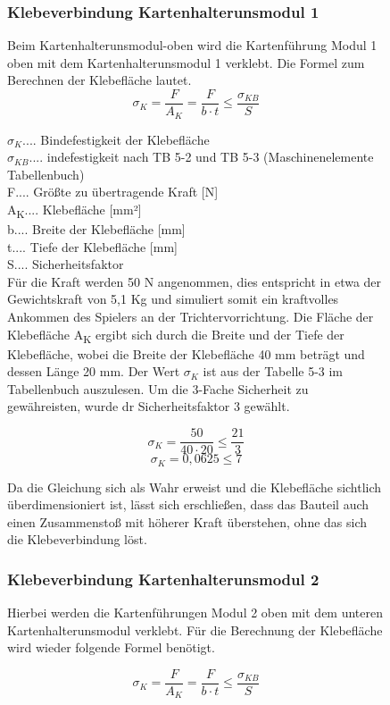 \begin{figure}
\subsubsection{Klebeverbindung Kartenhalterunsmodul 1}
Beim Kartenhalterunsmodul-oben wird die Kartenführung Modul 1 oben mit dem Kartenhalterunsmodul 1 verklebt.
Die Formel zum Berechnen der Klebefläche lautet.
\[\sigma _{K} = \frac{F}{A_{K}} = \frac{F}{b\cdot t}\leq \frac{\sigma _{KB}}{S}\]

$\sigma_{K}$.... Bindefestigkeit der Klebefläche \\
$\sigma_{KB}$.... indefestigkeit nach TB 5-2 und TB 5-3 (Maschinenelemente Tabellenbuch)\\
F.... Größte zu übertragende Kraft [N]\\
A\textsubscript{K}.... Klebefläche [mm²]\\
b.... Breite der Klebefläche [mm]\\
t.... Tiefe der Klebefläche [mm]\\
S.... Sicherheitsfaktor\\

Für die Kraft werden 50 N angenommen, dies entspricht in etwa der Gewichtskraft von 5,1 Kg
und simuliert somit ein kraftvolles Ankommen des Spielers an der Trichtervorrichtung.
Die Fläche der Klebefläche A\textsubscript{K} ergibt sich durch die Breite und der Tiefe der Klebefläche, wobei
die Breite der Klebefläche  40 mm beträgt und dessen Länge 20 mm.
Der Wert $\sigma_{K}$ ist aus der Tabelle 5-3 im Tabellenbuch auszulesen.
Um die 3-Fache Sicherheit zu gewähreisten, wurde dr Sicherheitsfaktor 3 gewählt.


\[\sigma _{K} = \frac{50}{40\cdot 20}\leq \frac{21}{3}\]
\[\sigma _{K} = 0,0625\leq 7\]

Da die Gleichung sich als Wahr erweist und die Klebefläche sichtlich überdimensioniert ist, lässt sich erschließen,
dass das Bauteil auch einen Zusammenstoß mit höherer Kraft überstehen, ohne das sich die Klebeverbindung löst.

\subsubsection{Klebeverbindung Kartenhalterunsmodul 2}
Hierbei werden die Kartenführungen Modul 2 oben mit dem unteren Kartenhalterunsmodul verklebt.
Für die Berechnung der Klebefläche wird wieder folgende Formel benötigt.

\[\sigma _{K} = \frac{F}{A_{K}} = \frac{F}{b\cdot t}\leq \frac{\sigma _{KB}}{S}\]


\end{figure}
